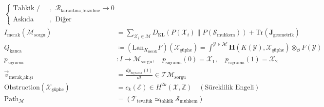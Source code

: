 \documentclass[11pt, a4paper]{article}
\begin{document}
\begin{align}
\begin{cases}
\text{Tahkik / Tasdik (Noktaya Büzülme)}, & \mathcal{R}_{\text{karantina\_büzülme}} \to 0 \\
\text{Askıda (Şüphe Uzayı Kalıcı)}, & \text{Diğer}
\end{cases} \\
I_{\text{merak}}(\mathcal{M}_{\text{sorgu}}) &= \sum_{\mathcal{X}_i \in \mathcal{M}} D_{\text{KL}}\left( P(\mathcal{X}_i) \parallel P(\mathcal{S}_{\text{muhkem}}) \right) + \text{Tr}(\mathbf{J}_{\text{geometrik}}) \\
Q_{\text{kanca}} &\coloneqq (\text{Lan}_{K_{\text{merak}}} F)(\mathcal{X}_{\text{şüphe}}) = \int^{\mathcal{Y} \in \mathcal{M}} \mathbf{H}(K(\mathcal{Y}), \mathcal{X}_{\text{şüphe}}) \otimes_{\mathcal{O}} F(\mathcal{Y}) \\
p_{\text{sıçrama}} &: I \longrightarrow \mathcal{M}_{\text{sorgu}}, \quad p_{\text{sıçrama}}(0) = \mathcal{X}_1, \quad p_{\text{sıçrama}}(1) = \mathcal{X}_2 \\
\vec{v}_{\text{merak\_akışı}} &= \frac{d p_{\text{sıçrama}}(t)}{dt} \in \mathcal{T}\mathcal{M}_{\text{sorgu}} \\
\text{Obstruction}(\mathcal{X}_{\text{şüphe}}) &= c_k(\mathcal{E}) \in H^{2k}(\mathcal{X}, \mathbb{Z}) \quad (\text{Süreklilik Engeli}) \\
\text{Path}_{\mathcal{M}} &= (\mathcal{T}_{\text{tevafuk}} \simeq_{\text{tahkik}} \mathcal{S}_{\text{muhkem}})
\end{align}
\end{document}
